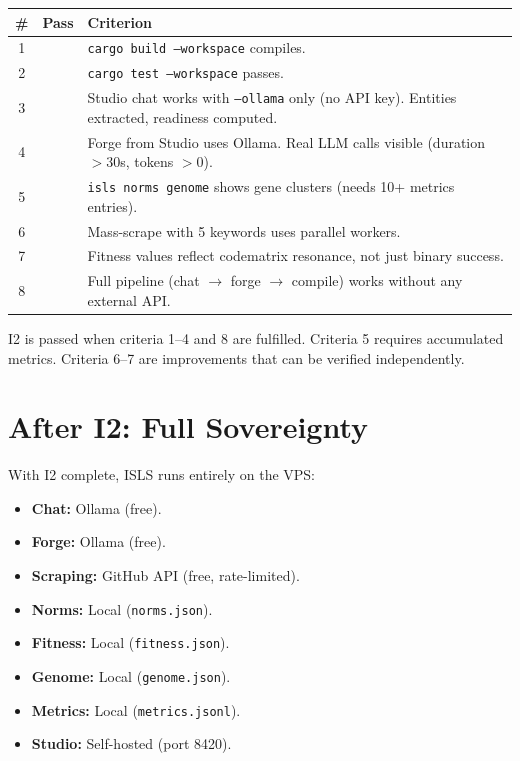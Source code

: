\documentclass[11pt,a4paper]{article}
\begin{document}
\begin{longtable}{clp{9cm}}
\toprule
\textbf{\#} & \textbf{Pass} & \textbf{Criterion} \\
\midrule
1 & & \texttt{cargo build --workspace} compiles. \\
2 & & \texttt{cargo test --workspace} passes. \\
3 & & Studio chat works with \texttt{--ollama} only (no API key). 
      Entities extracted, readiness computed. \\
4 & & Forge from Studio uses Ollama. Real LLM calls visible 
      (duration $> 30$s, tokens $> 0$). \\
5 & & \texttt{isls norms genome} shows gene clusters (needs 
      10+ metrics entries). \\
6 & & Mass-scrape with 5 keywords uses parallel workers. \\
7 & & Fitness values reflect codematrix resonance, not just 
      binary success. \\
8 & & Full pipeline (chat $\to$ forge $\to$ compile) works 
      without any external API. \\
\bottomrule
\end{longtable}

I2 is passed when criteria 1--4 and 8 are fulfilled. 
Criteria 5 requires accumulated metrics. Criteria 6--7 
are improvements that can be verified independently.


\section{After I2: Full Sovereignty}

With I2 complete, ISLS runs entirely on the VPS:

\begin{itemize}[nosep]
\item \textbf{Chat:} Ollama (free).
\item \textbf{Forge:} Ollama (free).
\item \textbf{Scraping:} GitHub API (free, rate-limited).
\item \textbf{Norms:} Local (\texttt{norms.json}).
\item \textbf{Fitness:} Local (\texttt{fitness.json}).
\item \textbf{Genome:} Local (\texttt{genome.json}).
\item \textbf{Metrics:} Local (\texttt{metrics.jsonl}).
\item \textbf{Studio:} Self-hosted (port 8420).
\end{itemize}
\end{document}

